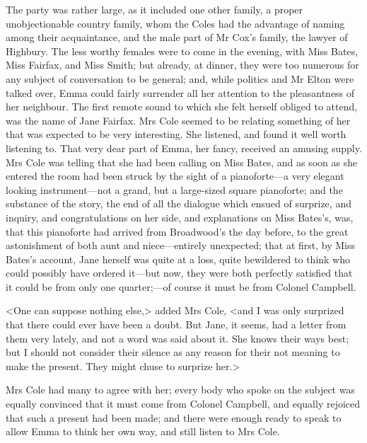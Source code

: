 The party was rather large, as it included one other family, a proper unobjectionable country family, whom the Coles had the advantage of naming among their acquaintance, and the male part of Mr Cox's family, the lawyer of Highbury. The less worthy females were to come in the evening, with Miss Bates, Miss Fairfax, and Miss Smith; but already, at dinner, they were too numerous for any subject of conversation to be general; and, while politics and Mr Elton were talked over, Emma could fairly surrender all her attention to the pleasantness of her neighbour. The first remote sound to which she felt herself obliged to attend, was the name of Jane Fairfax. Mrs Cole seemed to be relating something of her that was expected to be very interesting. She listened, and found it well worth listening to. That very dear part of Emma, her fancy, received an amusing supply. Mrs Cole was telling that she had been calling on Miss Bates, and as soon as she entered the room had been struck by the sight of a pianoforte—a very elegant looking instrument—not a grand, but a large-sized square pianoforte; and the substance of the story, the end of all the dialogue which ensued of surprize, and inquiry, and congratulations on her side, and explanations on Miss Bates's, was, that this pianoforte had arrived from Broadwood's the day before, to the great astonishment of both aunt and niece—entirely unexpected; that at first, by Miss Bates's account, Jane herself was quite at a loss, quite bewildered to think who could possibly have ordered it—but now, they were both perfectly satisfied that it could be from only one quarter;—of course it must be from Colonel Campbell.

<One can suppose nothing else,> added Mrs Cole, <and I was only surprized that there could ever have been a doubt. But Jane, it seems, had a letter from them very lately, and not a word was said about it. She knows their ways best; but I should not consider their silence as any reason for their not meaning to make the present. They might chuse to surprize her.>

Mrs Cole had many to agree with her; every body who spoke on the subject was equally convinced that it must come from Colonel Campbell, and equally rejoiced that such a present had been made; and there were enough ready to speak to allow Emma to think her own way, and still listen to Mrs Cole.

